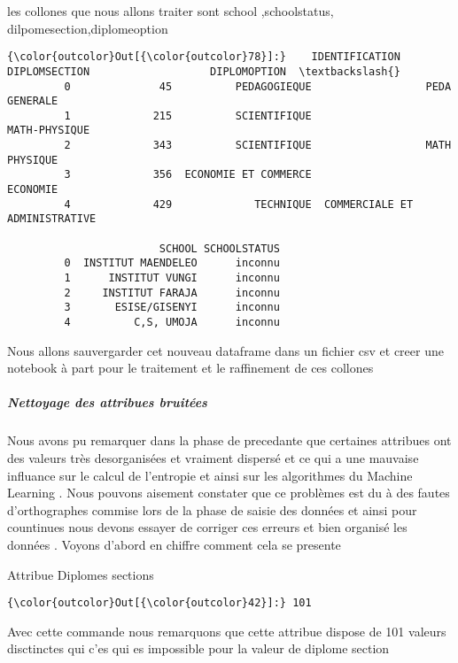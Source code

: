 \documentclass[11pt]{article}
\begin{document}
    les collones que nous allons traiter sont school ,schoolstatus,
dilpomesection,diplomeoption

            \begin{Verbatim}[commandchars=\\\{\}]
{\color{outcolor}Out[{\color{outcolor}78}]:}    IDENTIFICATION         DIPLOMSECTION                   DIPLOMOPTION  \textbackslash{}
         0              45          PEDAGOGIEQUE                  PEDA GENERALE   
         1             215          SCIENTIFIQUE                  MATH-PHYSIQUE   
         2             343          SCIENTIFIQUE                  MATH PHYSIQUE   
         3             356  ECONOMIE ET COMMERCE                       ECONOMIE   
         4             429             TECHNIQUE  COMMERCIALE ET ADMINISTRATIVE   
         
                        SCHOOL SCHOOLSTATUS  
         0  INSTITUT MAENDELEO      inconnu  
         1      INSTITUT VUNGI      inconnu  
         2     INSTITUT FARAJA      inconnu  
         3       ESISE/GISENYI      inconnu  
         4          C,S, UMOJA      inconnu  
\end{Verbatim}
        
    Nous allons sauvergarder cet nouveau dataframe dans un fichier csv et
creer une notebook à part pour le traitement et le raffinement de ces
collones

    \subparagraph{Nettoyage des attribues
bruitées}\label{nettoyage-des-attribues-bruituxe9es}

    Nous avons pu remarquer dans la phase de precedante que certaines
attribues ont des valeurs très desorganisées et vraiment dispersé et ce
qui a une mauvaise influance sur le calcul de l'entropie et ainsi sur
les algorithmes du Machine Learning . Nous pouvons aisement constater
que ce problèmes est du à des fautes d'orthographes commise lors de la
phase de saisie des données et ainsi pour countinues nous devons essayer
de corriger ces erreurs et bien organisé les données . Voyons d'abord en
chiffre comment cela se presente

    Attribue Diplomes sections

            \begin{Verbatim}[commandchars=\\\{\}]
{\color{outcolor}Out[{\color{outcolor}42}]:} 101
\end{Verbatim}
        
    Avec cette commande nous remarquons que cette attribue dispose de 101
valeurs disctinctes qui c'es qui es impossible pour la valeur de diplome
section
\end{document}
